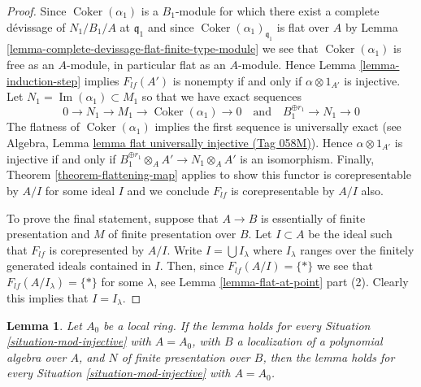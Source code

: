 \documentclass{amsart}
\theoremstyle{plain}
\newtheorem{lemma}[subsection]{Lemma}
\theoremstyle{definition}
\theoremstyle{remark}
\numberwithin{equation}{subsection}
\def\Im{\mathop{\mathrm{Im}}}
\def\Coker{\mathop{\mathrm{Coker}}}
\begin{document}
\begin{proof}
\medskip\noindent
Since $\Coker(\alpha_1)$ is a $B_1$-module for which
there exist a complete d\'evissage of $N_1/B_1/A$ at $\mathfrak q_1$
and since $\Coker(\alpha_1)_{\mathfrak q_1}$ is
flat over $A$ by
Lemma \ref{lemma-complete-devissage-flat-finite-type-module}
we see that $\Coker(\alpha_1)$ is free as an $A$-module, in particular
flat as an $A$-module. Hence
Lemma \ref{lemma-induction-step}
implies $F_{lf}(A')$ is nonempty if and only if $\alpha \otimes 1_{A'}$
is injective. Let $N_1 = \Im(\alpha_1) \subset M_1$ so that
we have exact sequences
$$
0 \to N_1 \to M_1 \to \Coker(\alpha_1) \to 0
\quad\text{and}\quad
B_1^{\oplus r_1} \to N_1 \to 0
$$
The flatness of $\Coker(\alpha_1)$ implies the first sequence
is universally exact (see
Algebra, Lemma \href{https://stacks.math.columbia.edu/tag/058M}{lemma flat universally injective (Tag 058M)}).
Hence $\alpha \otimes 1_{A'}$ is injective if and only if
$B_1^{\oplus r_1} \otimes_A A' \to N_1 \otimes_A A'$
is an isomorphism. Finally,
Theorem \ref{theorem-flattening-map}
applies to show this functor is corepresentable by $A/I$ for some ideal $I$
and we conclude $F_{lf}$ is corepresentable by $A/I$ also.

\medskip\noindent
To prove the final statement, suppose that $A \to B$ is essentially of finite
presentation and $M$ of finite presentation over $B$. Let $I \subset A$
be the ideal such that $F_{lf}$ is corepresented by $A/I$.
Write $I = \bigcup I_\lambda$ where $I_\lambda$ ranges over the finitely
generated ideals contained in $I$. Then, since $F_{lf}(A/I) = \{*\}$
we see that $F_{lf}(A/I_\lambda) = \{*\}$ for some $\lambda$, see
Lemma \ref{lemma-flat-at-point} part (2).
Clearly this implies that $I = I_\lambda$.
\end{proof}


\begin{lemma}
\label{lemma-reduce-finite-type-injective-into-flat-mod-m}
Let $A_0$ be a local ring. If the lemma holds for every
Situation \ref{situation-mod-injective} with $A = A_0$, with $B$ a
localization of a polynomial algebra over $A$, and $N$ of finite presentation
over $B$, then the lemma holds for every
Situation \ref{situation-mod-injective} with $A = A_0$.
\end{lemma}
\end{document}
